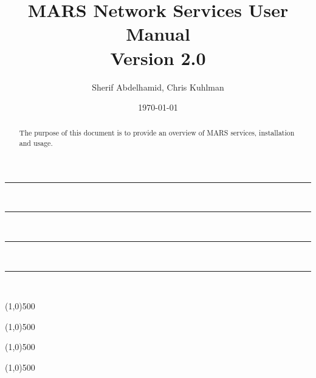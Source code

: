 \documentclass{article}%
\newcommand{\HRule}{\rule{\linewidth}{0.5mm}}
\begin{document}
\title{MARS Network Services User Manual\\
Version 2.0}

\author{Sherif Abdelhamid, Chris Kuhlman}

\date{\today}
\maketitle


\tiny

\HRule \\[0.05cm]

\HRule \\[0.05cm]

\small

\tableofcontents

\tiny

\HRule \\[0.05cm]

\HRule \\[0.05cm]

\normalsize


\begin{abstract}

The purpose of this document is to provide an overview of MARS services, installation and usage.

\end{abstract}




\line(1,0){500}



\line(1,0){500}



\line(1,0){500}



\line(1,0){500}

%
%

%
%
\end{document}

